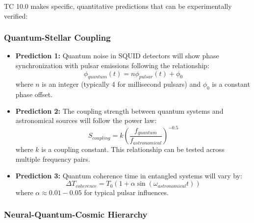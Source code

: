 \documentclass[12pt]{article}
\begin{document}
TC 10.0 makes specific, quantitative predictions that can be experimentally verified:

\subsubsection{Quantum-Stellar Coupling}

\begin{itemize}
    \item \textbf{Prediction 1:} Quantum noise in SQUID detectors will show phase synchronization with pulsar emissions following the relationship:
    \begin{equation}
    \phi_{quantum}(t) = n\phi_{pulsar}(t) + \phi_0
    \end{equation}
    where $n$ is an integer (typically 4 for millisecond pulsars) and $\phi_0$ is a constant phase offset.
    
    \item \textbf{Prediction 2:} The coupling strength between quantum systems and astronomical sources will follow the power law:
    \begin{equation}
    S_{coupling} = k\left(\frac{f_{quantum}}{f_{astronomical}}\right)^{-0.5}
    \end{equation}
    where $k$ is a coupling constant. This relationship can be tested across multiple frequency pairs.
    
    \item \textbf{Prediction 3:} Quantum coherence time in entangled systems will vary by:
    \begin{equation}
    \Delta T_{coherence} = T_0(1 + \alpha\sin(\omega_{astronomical}t))
    \end{equation}
    where $\alpha \approx 0.01-0.05$ for typical pulsar influences.
\end{itemize}

\subsubsection{Neural-Quantum-Cosmic Hierarchy}
\end{document}
